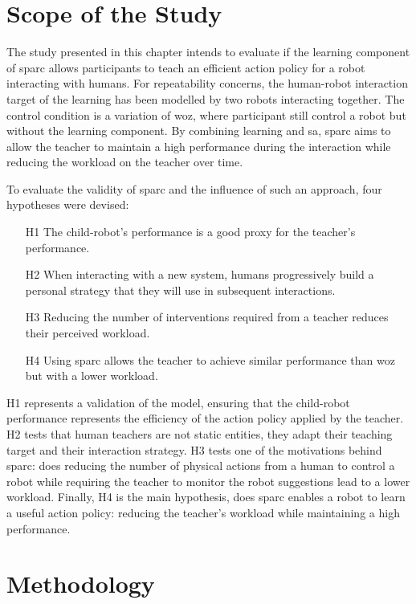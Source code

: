 \section{Scope of the Study}

The study presented in this chapter intends to evaluate if the learning component of \gls{sparc} allows participants to teach an efficient action policy for a robot interacting with humans. For repeatability concerns, the human-robot interaction target of the learning has been modelled by two robots interacting together. The control condition is a variation of \gls{woz}, where participant still control a robot but without the learning component. By combining learning and \gls{sa}, \gls{sparc} aims to allow the teacher to maintain a high performance during the interaction while reducing the workload on the teacher over time.

To evaluate the validity of \gls{sparc} and the influence of such an approach, four hypotheses were devised:
\begin{enumerate}
	\item [H1] The child-robot's performance is a good proxy for the teacher's performance.
	\item [H2] When interacting with a new system, humans progressively build a personal strategy that they will use in subsequent interactions.
	\item [H3] Reducing the number of interventions required from a teacher reduces their perceived workload.
	\item [H4] Using \gls{sparc} allows the teacher to achieve similar performance than \gls{woz} but with a lower workload.
\end{enumerate}

H1 represents a validation of the model, ensuring that the child-robot performance represents the efficiency of the action policy applied by the teacher. H2 tests that human teachers are not static entities, they adapt their teaching target and their interaction strategy. H3 tests one of the motivations behind \gls{sparc}: does reducing the number of physical actions from a human to control a robot while requiring the teacher to monitor the robot suggestions lead to a lower workload. Finally, H4 is the main hypothesis, does \gls{sparc} enables a robot to learn a useful action policy: reducing the teacher's workload while maintaining a high performance.

\section{Methodology}


